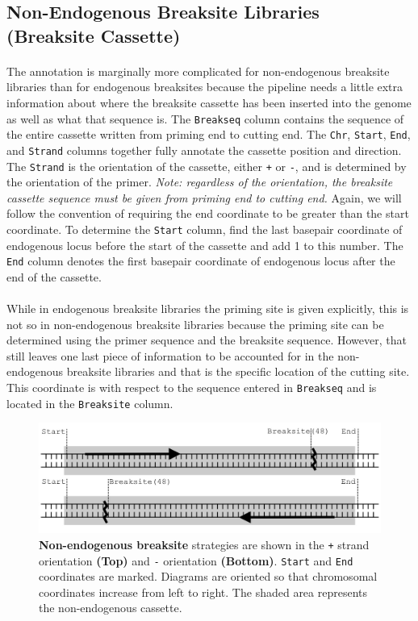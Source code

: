 \documentclass{article}
\begin{document}
\subsection{Non-Endogenous Breaksite Libraries (Breaksite Cassette)}
\paragraph{} The annotation is marginally more complicated for non-endogenous breaksite libraries than for endogenous breaksites because the pipeline needs a little extra information about where the breaksite cassette has been inserted into the genome as well as what that sequence is. The \texttt{Breakseq} column contains the sequence of the entire cassette written from priming end to cutting end. The \texttt{Chr}, \texttt{Start}, \texttt{End}, and \texttt{Strand} columns together fully annotate the cassette position and direction. The \texttt{Strand} is the orientation of the cassette, either \texttt{+} or \texttt{-}, and is determined by the orientation of the primer. \emph{Note: regardless of the orientation, the breaksite cassette sequence must be given from priming end to cutting end.} Again, we will follow the convention of requiring the end coordinate to be greater than the start coordinate. To determine the \texttt{Start} column, find the last basepair coordinate of endogenous locus before the start of the cassette and add 1 to this number. The \texttt{End} column denotes the first basepair coordinate of endogenous locus after the end of the cassette.
\paragraph{} While in endogenous breaksite libraries the priming site is given explicitly, this is not so in non-endogenous breaksite libraries because the priming site can be determined using the primer sequence and the breaksite sequence. However, that still leaves one last piece of information to be accounted for in the non-endogenous breaksite libraries and that is the specific location of the cutting site. This coordinate is with respect to the sequence entered in \texttt{Breakseq} and is located in the \texttt{Breaksite} column.
\begin{figure}[ht]
\centering
  \includegraphics[width=\textwidth]{nonendogenous_breaksite}
\caption{\textbf{Non-endogenous breaksite} strategies are shown in the \texttt{+} strand orientation \textbf{(Top)} and \texttt{-} orientation \textbf{(Bottom)}. \texttt{Start} and \texttt{End} coordinates are marked. Diagrams are oriented so that chromosomal coordinates increase from left to right. The shaded area represents the non-endogenous cassette.}
\label{overflow}
\end{figure}
\end{document}
